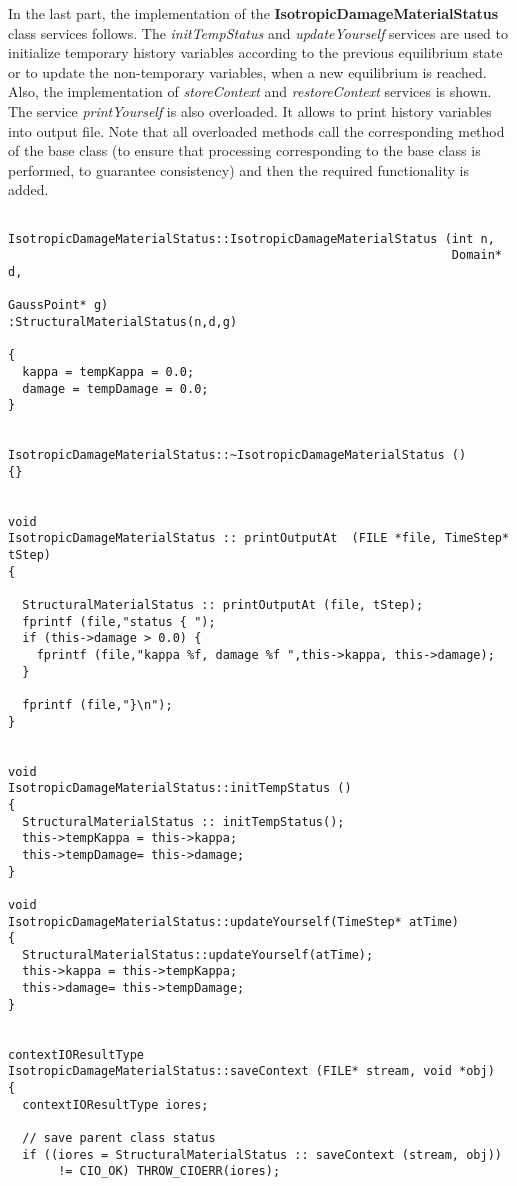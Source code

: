 \documentclass[12pt,draft]{article}
\newcommand{\class}[1]{{\bf #1}}
\newcommand{\service}[1]{{\em #1}}
\begin{document}
In the last part, the implementation of
the \class{IsotropicDamageMaterialStatus} class services follows. 
The \service{initTempStatus} and \service{updateYourself} services are 
used to initialize temporary history variables according to the previous
equilibrium state or to update the non-temporary variables, when a new
equilibrium is reached. Also, the implementation of
\service{storeContext} and \service{restoreContext} services is shown.
The service \service{printYourself} is also overloaded. It allows to print history variables
into output file.
Note that all overloaded methods call the corresponding method of the base
class (to ensure that processing corresponding to the base class is
performed, to guarantee consistency) and then the required functionality is added.


{\small
\begin{verbatim}

IsotropicDamageMaterialStatus::IsotropicDamageMaterialStatus (int n, 
                                                              Domain* d, 
                                                              GaussPoint* g)
:StructuralMaterialStatus(n,d,g)

{
  kappa = tempKappa = 0.0;
  damage = tempDamage = 0.0;
}


IsotropicDamageMaterialStatus::~IsotropicDamageMaterialStatus () 
{}


void 
IsotropicDamageMaterialStatus :: printOutputAt  (FILE *file, TimeStep* tStep)
{
  
  StructuralMaterialStatus :: printOutputAt (file, tStep);
  fprintf (file,"status { ");
  if (this->damage > 0.0) {
    fprintf (file,"kappa %f, damage %f ",this->kappa, this->damage);
  }
  
  fprintf (file,"}\n");
}
 

void 
IsotropicDamageMaterialStatus::initTempStatus ()
{
  StructuralMaterialStatus :: initTempStatus();
  this->tempKappa = this->kappa;
  this->tempDamage= this->damage;
}

void 
IsotropicDamageMaterialStatus::updateYourself(TimeStep* atTime)
{
  StructuralMaterialStatus::updateYourself(atTime);
  this->kappa = this->tempKappa;
  this->damage= this->tempDamage;
}


contextIOResultType
IsotropicDamageMaterialStatus::saveContext (FILE* stream, void *obj)
{
  contextIOResultType iores;

  // save parent class status
  if ((iores = StructuralMaterialStatus :: saveContext (stream, obj)) 
       != CIO_OK) THROW_CIOERR(iores);


\end{verbatim}}
\end{document}
